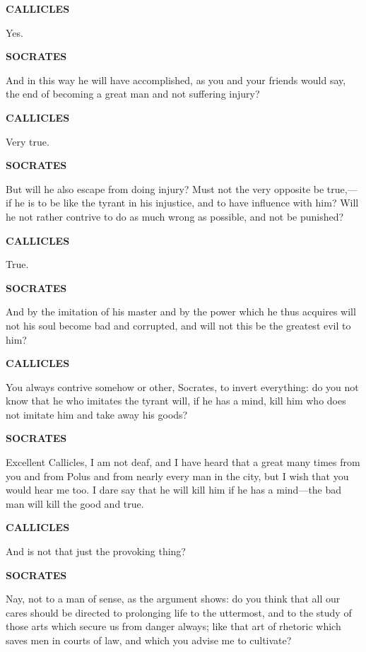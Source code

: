 \documentclass[11pt,letter]{article}
\begin{document}
\par \textbf{CALLICLES}
\par   Yes.

\par \textbf{SOCRATES}
\par   And in this way he will have accomplished, as you and your friends would say, the end of becoming a great man and not suffering injury?

\par \textbf{CALLICLES}
\par   Very true.

\par \textbf{SOCRATES}
\par   But will he also escape from doing injury? Must not the very opposite be true,—if he is to be like the tyrant in his injustice, and to have influence with him? Will he not rather contrive to do as much wrong as possible, and not be punished?

\par \textbf{CALLICLES}
\par   True.

\par \textbf{SOCRATES}
\par   And by the imitation of his master and by the power which he thus acquires will not his soul become bad and corrupted, and will not this be the greatest evil to him?

\par \textbf{CALLICLES}
\par   You always contrive somehow or other, Socrates, to invert everything:  do you not know that he who imitates the tyrant will, if he has a mind, kill him who does not imitate him and take away his goods?

\par \textbf{SOCRATES}
\par   Excellent Callicles, I am not deaf, and I have heard that a great many times from you and from Polus and from nearly every man in the city, but I wish that you would hear me too. I dare say that he will kill him if he has a mind—the bad man will kill the good and true.

\par \textbf{CALLICLES}
\par   And is not that just the provoking thing?

\par \textbf{SOCRATES}
\par   Nay, not to a man of sense, as the argument shows:  do you think that all our cares should be directed to prolonging life to the uttermost, and to the study of those arts which secure us from danger always; like that art of rhetoric which saves men in courts of law, and which you advise me to cultivate?
\end{document}
